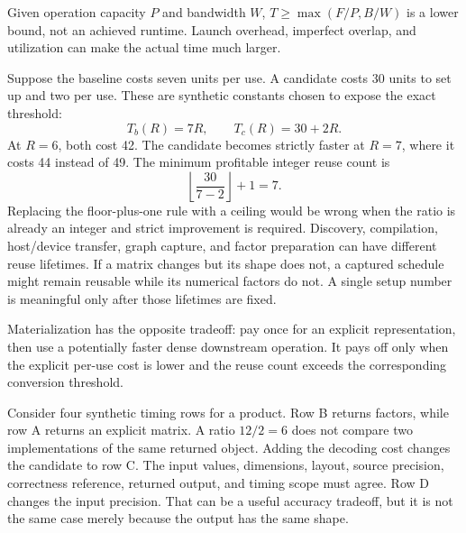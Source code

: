 Given operation capacity $P$ and bandwidth $W$, $T\ge\max(F/P,B/W)$ is a lower bound, not an achieved runtime. Launch overhead, imperfect overlap, and utilization can make the actual time much larger.

Suppose the baseline costs seven units per use. A candidate costs 30 units to set up and two per use. These are synthetic constants chosen to expose the exact threshold:
\[
T_b(R)=7R,\qquad T_c(R)=30+2R.
\]
At $R=6$, both cost 42. The candidate becomes strictly faster at $R=7$, where it costs 44 instead of 49. The minimum profitable integer reuse count is
\[
\left\lfloor\frac{30}{7-2}\right\rfloor+1=7.
\]
Replacing the floor-plus-one rule with a ceiling would be wrong when the ratio is already an integer and strict improvement is required.
Discovery, compilation, host/device transfer, graph capture, and factor preparation can have different reuse lifetimes. If a matrix changes but its shape does not, a captured schedule might remain reusable while its numerical factors do not. A single setup number is meaningful only after those lifetimes are fixed.

Materialization has the opposite tradeoff: pay once for an explicit representation, then use a potentially faster dense downstream operation. It pays off only when the explicit per-use cost is lower and the reuse count exceeds the corresponding conversion threshold.

Consider four synthetic timing rows for a product. Row B returns factors, while row A returns an explicit matrix. A ratio $12/2=6$ does not compare two implementations of the same returned object. Adding the decoding cost changes the candidate to row C.
The input values, dimensions, layout, source precision, correctness reference, returned output, and timing scope must agree. Row D changes the input precision. That can be a useful accuracy tradeoff, but it is not the same case merely because the output has the same shape.

